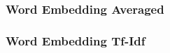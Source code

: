             
            
            
            \subsubsection{Word Embedding Averaged}
            \subsubsection{Word Embedding Tf-Idf}
            
            
            
            
            
            